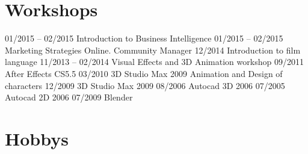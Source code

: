 \documentclass[11pt,a4paper,roman]{moderncv}
\newcommand\BackImage[2][scale=1]{%
\BgThispage
\backgroundsetup{
  contents={\texttt{[image: \#2]}}
  }
}
\begin{document}
\section{Workshops} 
 			{01/2015 -- 02/2015 Introduction to Business Intelligence}
\cvline{} 					{01/2015 -- 02/2015 Marketing Strategies Online. Community Manager}
\cvline{} 					{12/2014 \hspace{17mm} Introduction to film language}
	{11/2013 -- 02/2014 Visual Effects and 3D Animation workshop}
		{09/2011 \hspace{15mm} After Effects CS5.5}
\cvline{}					{03/2010 \hspace{15mm} 3D Studio Max 2009 Animation and Design of characters}
\cvline{}					{12/2009 \hspace{15mm} 3D Studio Max 2009}
\cvline{}					{08/2006 \hspace{15mm} Autocad 3D 2006}
\cvline{}					{07/2005 \hspace{15mm} Autocad 2D 2006}
				{07/2009 \hspace{15mm} Blender}

\section{Hobbys}






\end{document}
